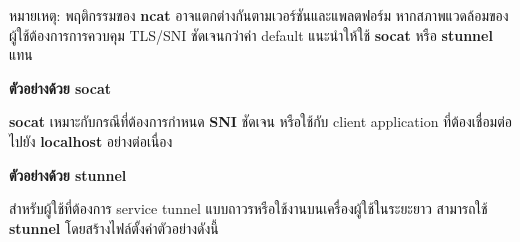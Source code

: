 \hspace*{1.3em}
หมายเหตุ: พฤติกรรมของ \textbf{ncat} อาจแตกต่างกันตามเวอร์ชันและแพลตฟอร์ม หากสภาพแวดล้อมของผู้ใช้ต้องการการควบคุม TLS/SNI ชัดเจนกว่าค่า default แนะนำให้ใช้ \textbf{socat} หรือ \textbf{stunnel} แทน

\vspace{0.5em}
\textbf{ตัวอย่างด้วย socat}
\vspace{0.5em}

\begin{figure}[H]
\centering
{}
\caption{}
\label{figI:TcpTunnelSocat}
\end{figure}

\hspace*{1.3em}
\textbf{socat} เหมาะกับกรณีที่ต้องการกำหนด \textbf{SNI} ชัดเจน หรือใช้กับ client application ที่ต้องเชื่อมต่อไปยัง \textbf{localhost} อย่างต่อเนื่อง

\vspace{0.5em}
\textbf{ตัวอย่างด้วย stunnel}
\vspace{0.5em}

\hspace*{1.3em}
สำหรับผู้ใช้ที่ต้องการ service tunnel แบบถาวรหรือใช้งานบนเครื่องผู้ใช้ในระยะยาว สามารถใช้ \textbf{stunnel} โดยสร้างไฟล์ตั้งค่าตัวอย่างดังนี้

\begin{figure}[H]
\centering
{}
\caption{}
\label{figI:TcpTunnelStunnel}
\end{figure}

